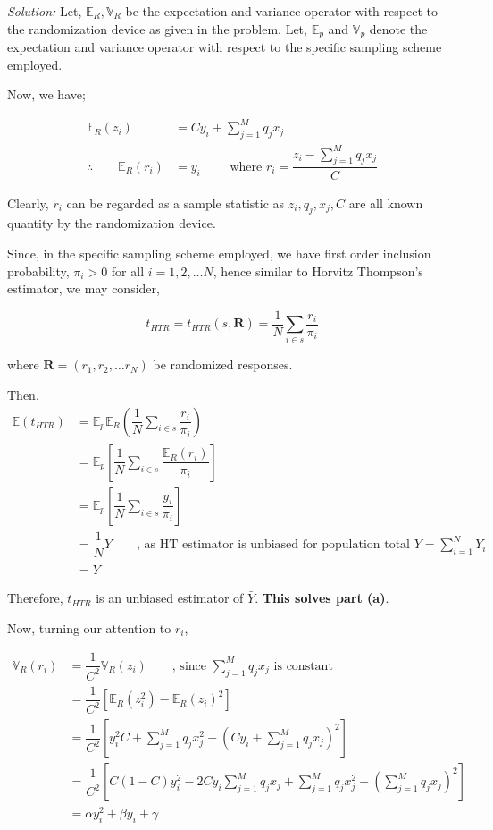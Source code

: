\documentclass[12pt]{article}
\newcommand{\E}{\mathbb{E}}
\newcommand{\Var}{\mathbb{V}}
\theoremstyle{definition}
\newenvironment{answer}{\textit{Solution: }\quad }{ \hfill \qedsymbol}
\begin{document}
\begin{answer}
	Let, $\E_R, \Var_R$ be the expectation and variance operator with respect to the randomization device as given in the problem. Let, $\E_p$ and $\Var_p$ denote the expectation and variance operator with respect to the specific sampling scheme employed.

	Now, we have;

	\begin{align*}
		\E_R(z_i) & = C y_i + \sum_{j=1}^{M} q_jx_j\\
		\therefore \qquad \E_R(r_i) & = y_i \qquad \text{ where } r_i = \dfrac{z_i - \sum_{j=1}^{M} q_jx_j }{C}
	\end{align*}

	Clearly, $r_i$ can be regarded as a sample statistic as $z_i, q_j, x_j, C$ are all known quantity by the randomization device.

	Since, in the specific sampling scheme employed, we have first order inclusion probability, $\pi_i > 0$ for all $i = 1, 2, \dots N$, hence similar to Horvitz Thompson's estimator, we may consider,

	$$t_{HTR} = t_{HTR}(s, \bm{R}) = 
	\dfrac{1}{N} \sum_{i \in s} \dfrac{r_i}{\pi_i}$$

	where $\bm{R} = (r_1, r_2, \dots r_N)$ be randomized responses.
	
	Then,
	\begin{align*}
		\E(t_{HTR})
		& = \E_p \E_R \left( \dfrac{1}{N} \sum_{i \in s} \dfrac{r_i}{\pi_i} \right)\\
		& = \E_p \left[ \dfrac{1}{N} \sum_{i \in s} \dfrac{\E_R(r_i)}{\pi_i} \right]\\
		& = \E_p \left[ \dfrac{1}{N} \sum_{i \in s} \dfrac{y_i}{\pi_i} \right] \\
		& = \dfrac{1}{N} Y \qquad \text{, as HT estimator is unbiased for population total } Y = \sum_{i=1}^{N}Y_i\\
		& = \bar{Y}
	\end{align*}

	Therefore, $t_{HTR}$ is an unbiased estimator of $\bar{Y}$. \textbf{This solves part (a)}.

	Now, turning our attention to $r_i$,

	\begin{align*}
		\Var_R(r_i)
		& = \dfrac{1}{C^2} \Var_R(z_i) \qquad \text{, since } \sum_{j=1}^{M} q_jx_j \text{ is constant}\\
		& = \dfrac{1}{C^2} \left[ \E_R(z_i^2) - \E_R(z_i)^2 \right]\\
		& = \dfrac{1}{C^2} \left[ y_i^2 C + \sum_{j=1}^{M} q_jx_j^2 - \left( Cy_i + \sum_{j=1}^{M}q_jx_j \right)^2 \right]\\
		& = \dfrac{1}{C^2} \left[ C(1-C)y_i^2 - 2Cy_i \sum_{j=1}^{M}q_jx_j + \sum_{j=1}^{M}q_jx_j^2 - \left( \sum_{j=1}^{M}q_jx_j \right)^2 \right]\\
		& = \alpha y_i^2 + \beta y_i + \gamma
	\end{align*}


\end{answer}
\end{document}
